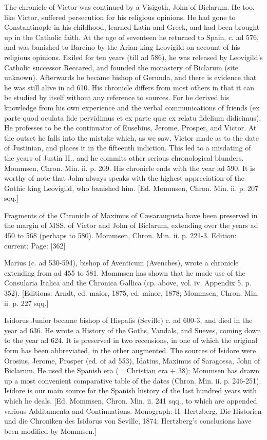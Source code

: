 The chronicle of Victor was continued by a Visigoth, John of Biclarum. He too, like Victor, suffered persecution for his religious opinions. He had gone to Constantinople in his childhood, learned Latin and Greek, and had been brought up in the Catholic faith. At the age of seventeen he returned to Spain, c. ad 576, and was banished to Barcino by the Arian king Leovigild on account of his religious opinions. Exiled for ten years (till ad 586), he was released by Leovigild\texthebrew{}’s Catholic successor Reccared, and founded the monastery of Biclarum (site unknown). Afterwards he became bishop of Gerunda, and there is evidence that he was still alive in ad 610. His chronicle differs from most others in that it can be studied by itself without any reference to sources. For he derived his knowledge from his own experience and the verbal communications of friends (ex parte quod oculata fide pervidimus et ex parte quæ ex relatu fidelium didicimus). He professes to be the continuator of Eusebius, Jerome, Prosper, and Victor. At the outset he falls into the mistake which, as we saw, Victor made as to the date of Justinian, and places it in the fifteenth indiction. This led to a misdating of the years of Justin II., and he commits other serious chronological blunders. Mommsen, Chron. Min. ii. p. 209. His chronicle ends with the year ad 590. It is worthy of note that John always speaks with the highest appreciation of the Gothic king Leovigild, who banished him. [Ed. Mommsen, Chron. Min. ii. p. 207 sqq.]

Fragments of the Chronicle of Maximus of Cæsaraugusta have been preserved in the margin of MSS. of Victor and John of Biclarum, extending over the years ad 450 to 568 (perhaps to 580). Mommsen, Chron. Min. ii. p. 221-3.
Edition: current; Page: [362]

Marius (c. ad 530-594), bishop of Aventicum (Avenches), wrote a chronicle extending from ad 455 to 581. Mommsen has shown that he made use of the Consularia Italica and the Chronica Gallica (cp. above, vol. iv. Appendix 5, p. 352). [Editions: Arndt, ed. maior, 1875, ed. minor, 1878; Mommsen, Chron. Min. ii. p. 227 sqq.]

Isidorus Junior became bishop of Hispalis (Seville) c. ad 600-3, and died in the year ad 636. He wrote a History of the Goths, Vandals, and Sueves, coming down to the year ad 624. It is preserved in two recensions, in one of which the original form has been abbreviated, in the other augmented. The sources of Isidore were Orosius, Jerome, Prosper (ed. of ad 553), Idatius, Maximus of Saragossa, John of Biclarum. He used the Spanish era (= Christian era + 38); Mommsen has drawn up a most convenient comparative table of the dates (Chron. Min. ii. p. 246-251). Isidore is our main source for the Spanish history of the last hundred years with which he deals. [Ed. Mommsen, Chron. Min. ii. 241 sqq., to which are appended various Additamenta and Continuations. Monograph: H. Hertzberg, Die Historien und die Chroniken des Isidorus von Seville, 1874; Hertzberg\texthebrew{}’s conclusions have been modified by Mommsen.]

